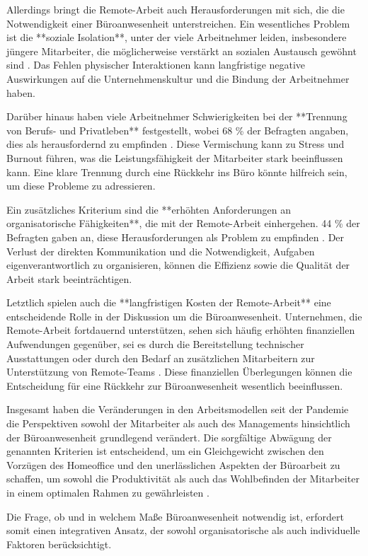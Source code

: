 Allerdings bringt die Remote-Arbeit auch Herausforderungen mit sich, die die Notwendigkeit einer Büroanwesenheit unterstreichen. Ein wesentliches Problem ist die **soziale Isolation**, unter der viele Arbeitnehmer leiden, insbesondere jüngere Mitarbeiter, die möglicherweise verstärkt an sozialen Austausch gewöhnt sind \cite{file1}. Das Fehlen physischer Interaktionen kann langfristige negative Auswirkungen auf die Unternehmenskultur und die Bindung der Arbeitnehmer haben.

Darüber hinaus haben viele Arbeitnehmer Schwierigkeiten bei der **Trennung von Berufs- und Privatleben** festgestellt, wobei 68 \% der Befragten angaben, dies als herausfordernd zu empfinden \cite{file1}. Diese Vermischung kann zu Stress und Burnout führen, was die Leistungsfähigkeit der Mitarbeiter stark beeinflussen kann. Eine klare Trennung durch eine Rückkehr ins Büro könnte hilfreich sein, um diese Probleme zu adressieren.

Ein zusätzliches Kriterium sind die **erhöhten Anforderungen an organisatorische Fähigkeiten**, die mit der Remote-Arbeit einhergehen. 44 \% der Befragten gaben an, diese Herausforderungen als Problem zu empfinden \cite{file1}. Der Verlust der direkten Kommunikation und die Notwendigkeit, Aufgaben eigenverantwortlich zu organisieren, können die Effizienz sowie die Qualität der Arbeit stark beeinträchtigen.

Letztlich spielen auch die **langfristigen Kosten der Remote-Arbeit** eine entscheidende Rolle in der Diskussion um die Büroanwesenheit. Unternehmen, die Remote-Arbeit fortdauernd unterstützen, sehen sich häufig erhöhten finanziellen Aufwendungen gegenüber, sei es durch die Bereitstellung technischer Ausstattungen oder durch den Bedarf an zusätzlichen Mitarbeitern zur Unterstützung von Remote-Teams \cite{file2}. Diese finanziellen Überlegungen können die Entscheidung für eine Rückkehr zur Büroanwesenheit wesentlich beeinflussen.

Insgesamt haben die Veränderungen in den Arbeitsmodellen seit der Pandemie die Perspektiven sowohl der Mitarbeiter als auch des Managements hinsichtlich der Büroanwesenheit grundlegend verändert. Die sorgfältige Abwägung der genannten Kriterien ist entscheidend, um ein Gleichgewicht zwischen den Vorzügen des Homeoffice und den unerlässlichen Aspekten der Büroarbeit zu schaffen, um sowohl die Produktivität als auch das Wohlbefinden der Mitarbeiter in einem optimalen Rahmen zu gewährleisten \cite{file1}. 

Die Frage, ob und in welchem Maße Büroanwesenheit notwendig ist, erfordert somit einen integrativen Ansatz, der sowohl organisatorische als auch individuelle Faktoren berücksichtigt.